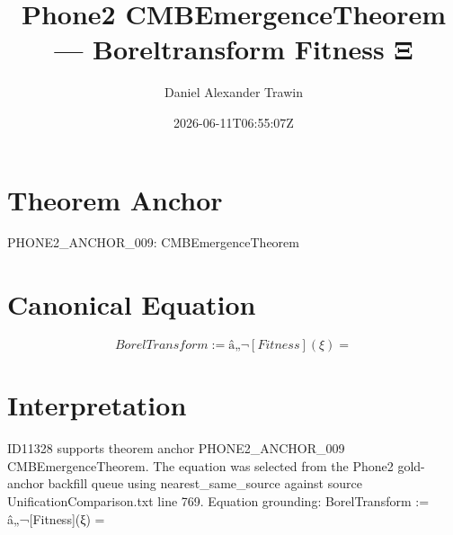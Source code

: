 \documentclass[11pt]{article}
\title{Phone2 CMBEmergenceTheorem — Boreltransform Fitness Ξ}
\author{Daniel Alexander Trawin}
\date{2026-06-11T06:55:07Z}
\begin{document}
\maketitle
\section*{Theorem Anchor}
PHONE2_ANCHOR_009: CMBEmergenceTheorem
\section*{Canonical Equation}
\[
BorelTransform := â„¬[Fitness](ξ) =
\]
\section*{Interpretation}
ID11328 supports theorem anchor PHONE2_ANCHOR_009 CMBEmergenceTheorem. The equation was selected from the Phone2 gold-anchor backfill queue using nearest_same_source against source UnificationComparison.txt line 769. Equation grounding: BorelTransform := â„¬[Fitness](ξ) =
\end{document}
